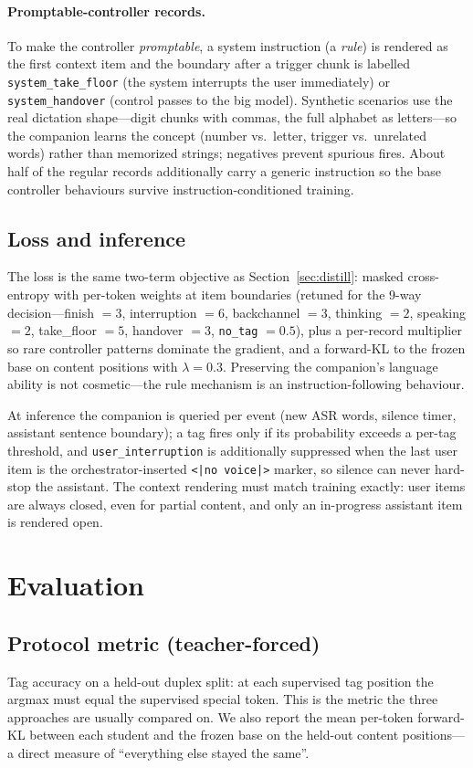 \documentclass[conference]{IEEEtran}
\begin{document}
\paragraph{Promptable-controller records.} To make the controller
\emph{promptable}, a system instruction (a \emph{rule}) is rendered as the first
context item and the boundary after a trigger chunk is labelled
\texttt{system\_take\_floor} (the system interrupts the user immediately) or
\texttt{system\_handover} (control passes to the big model). Synthetic scenarios
use the real dictation shape---digit chunks with commas, the full alphabet as
letters---so the companion learns the concept (number vs.\ letter, trigger vs.\
unrelated words) rather than memorized strings; negatives prevent spurious fires.
About half of the regular records additionally carry a generic instruction so the
base controller behaviours survive instruction-conditioned training.

\subsection{Loss and inference}
The loss is the same two-term objective as Section~\ref{sec:distill}: masked
cross-entropy with per-token weights at item boundaries (retuned for the 9-way
decision---finish $=3$, interruption $=6$, backchannel $=3$, thinking $=2$,
speaking $=2$, take\_floor $=5$, handover $=3$, \texttt{no\_tag} $=0.5$), plus a
per-record multiplier so rare controller patterns dominate the gradient, and a
forward-KL to the frozen base on content positions with $\lambda=0.3$. Preserving
the companion's language ability is not cosmetic---the rule mechanism is an
instruction-following behaviour.

At inference the companion is queried per event (new ASR words, silence timer,
assistant sentence boundary); a tag fires only if its probability exceeds a
per-tag threshold, and \texttt{user\_interruption} is additionally suppressed when
the last user item is the orchestrator-inserted \texttt{<|no voice|>} marker, so
silence can never hard-stop the assistant. The context rendering must match
training exactly: user items are always closed, even for partial content, and only
an in-progress assistant item is rendered open.

\section{Evaluation}
\label{sec:eval}

\subsection{Protocol metric (teacher-forced)}
Tag accuracy on a held-out duplex split: at each supervised tag position the
argmax must equal the supervised special token. This is the metric the three
approaches are usually compared on. We also report the mean per-token forward-KL
between each student and the frozen base on the held-out content positions---a
direct measure of ``everything else stayed the same''.
\end{document}
